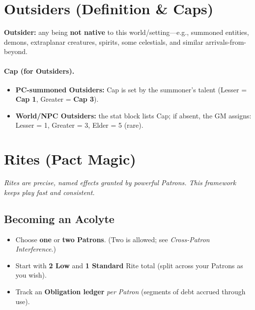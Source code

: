 \documentclass[11pt]{article}
\begin{document}
\section{Outsiders (Definition \& Caps)}

\textbf{Outsider:} any being \textbf{not native} to this world/setting—e.g., summoned entities, demons, extraplanar creatures, spirits, some celestials, and similar arrivals-from-beyond.

\paragraph{Cap (for Outsiders).}
\begin{itemize}
  \item \textbf{PC-summoned Outsiders:} Cap is set by the summoner's talent (Lesser = \textbf{Cap 1}, Greater = \textbf{Cap 3}).
  \item \textbf{World/NPC Outsiders:} the stat block lists Cap; if absent, the GM assigns: Lesser = 1, Greater = 3, Elder = 5 (rare).
\end{itemize}

\bigskip

\section{Rites (Pact Magic)}

\textit{Rites are precise, named effects granted by powerful Patrons. This framework keeps play fast and consistent.}

\subsection*{Becoming an Acolyte}
\begin{itemize}
  \item Choose \textbf{one} or \textbf{two Patrons}. (Two is allowed; see \emph{Cross-Patron Interference}.)
  \item Start with \textbf{2 Low} and \textbf{1 Standard} Rite total (split across your Patrons as you wish).
  \item Track an \textbf{Obligation ledger} \emph{per Patron} (segments of debt accrued through use).
\end{itemize}
\end{document}
